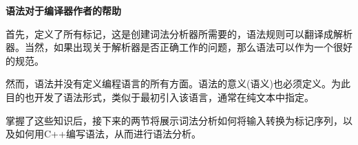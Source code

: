 \hspace*{\fill} \par %
\textbf{语法对于编译器作者的帮助}

首先，定义了所有标记，这是创建词法分析器所需要的，语法规则可以翻译成解析器。当然，如果出现关于解析器是否正确工作的问题，那么语法可以作为一个很好的规范。\par

然而，语法并没有定义编程语言的所有方面。语法的意义(语义)也必须定义。为此目的也开发了语法形式，类似于最初引入该语言，通常在纯文本中指定。\par

掌握了这些知识后，接下来的两节将展示词法分析如何将输入转换为标记序列，以及如何用C++编写语法，从而进行语法分析。\par

























